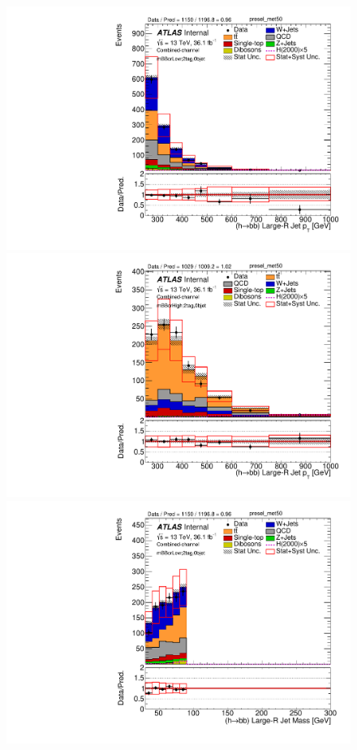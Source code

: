 \begin{figure}[!h]
\begin{center}
\includegraphics[scale=0.33]{./figures/boosted/PlotByMbbRegions/DataMC_2tag_0bjet_mbbcrLow_lepton_presel_met50_HbbPt}                                                                               
\includegraphics[scale=0.33]{./figures/boosted/PlotByMbbRegions/DataMC_2tag_0bjet_mbbcrHigh_lepton_presel_met50_HbbPt}                                                                              
\includegraphics[scale=0.33]{./figures/boosted/PlotByMbbRegions/DataMC_2tag_0bjet_mbbcrLow_lepton_presel_met50_HbbMass}                                                                             

\end{center}
\end{figure}
